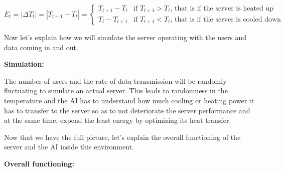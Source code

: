\documentclass[]{book}
\begin{document}
\begin{equation*}
E_t = |\Delta T_t| = |T_{t+1} - T_t| =
\begin{cases}
T_{t+1} - T_t & \textrm{if $T_{t+1} > T_t$, that is if the server is heated up} \\
T_t - T_{t+1} & \textrm{if $T_{t+1} < T_t$, that is if the server is cooled down}
\end{cases}
\end{equation*}

Now let's explain how we will simulate the server operating with the users and data coming in and out.

\textbf{Simulation:}

The number of users and the rate of data transmission will be randomly fluctuating to simulate an actual server. This leads to randomness in the temperature and the AI has to understand how much cooling or heating power it has to transfer to the server so as to not deteriorate the server performance and at the same time, expend the least energy by optimizing its heat transfer.

Now that we have the full picture, let's explain the overall functioning of the server and the AI inside this environment.

\textbf{Overall functioning:}
\end{document}
